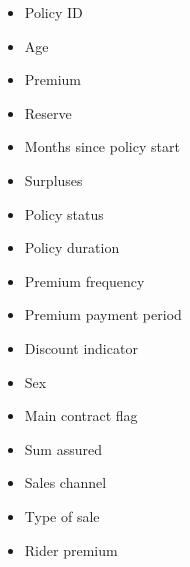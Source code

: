     \begin{multicols}{2}
	\begin{itemize}
		\item Policy ID
		\item Age
		\item Premium
		\item Reserve
		\item Months since policy start
		\item Surpluses
		\item Policy status
		\item Policy duration
		\item Premium frequency
		\item Premium payment period
		\item Discount indicator
		\item Sex
		\item Main contract flag
		\item Sum assured
		\item Sales channel
		\item Type of sale
		\item Rider premium
	\end{itemize}
\end{multicols}

